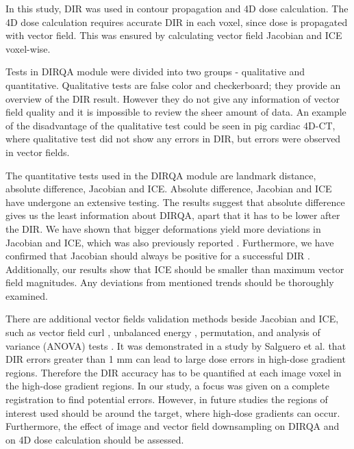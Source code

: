 \documentclass[type=dr, dr=rernat, accentcolor=tud7b,colorbacktitle, bigchapter, openright, twoside, 12pt ]{tudthesis}
\begin{document}
In this study, DIR was used in contour propagation and 4D dose calculation. The 4D dose calculation requires 
accurate DIR in each voxel, since dose is propagated with vector field. This was ensured by calculating vector field Jacobian and ICE voxel-wise. 

Tests in DIRQA module were divided into two groups - qualitative and quantitative. Qualitative tests are false color and checkerboard; they provide an overview of the DIR result.
However they do not give any information of vector field quality and it is impossible to review the sheer amount of data. An example of the disadvantage of the qualitative test could be seen in pig cardiac 4D-CT, where qualitative test did not show
any errors in DIR, but errors were observed in vector fields. 

The quantitative tests used in the DIRQA module are landmark distance, absolute difference, Jacobian and ICE. Absolute difference, Jacobian and ICE have undergone an extensive testing. The results suggest
that absolute difference gives us the least information about DIRQA, apart that it has to be lower after the DIR. 
We have shown that bigger deformations yield more deviations in Jacobian and ICE, which was also previously reported \cite{Stanley2013}. 
Furthermore, we have confirmed that Jacobian should always be positive for a successful DIR \cite{Rey2002}. Additionally, our results show that ICE should 
be smaller than maximum vector field magnitudes. Any deviations from mentioned trends should be thoroughly examined.

There are additional vector fields validation methods beside Jacobian and ICE, such as vector field curl \cite{Schreibmann2012}, unbalanced energy \cite{Zhong2007}, 
permutation, and analysis of variance (ANOVA) tests \cite{Klein2009}.
It was demonstrated in a study by Salguero et al. \cite{Salguero2011} that DIR errors greater than 1 mm can lead to large dose errors in high-dose gradient regions. 
Therefore the DIR accuracy has to be quantified at each image voxel in the high-dose 
gradient regions. In our study, a focus was given on a complete registration to find potential errors. However, in future studies the regions of interest used
should be around the target, where high-dose gradients can occur. Furthermore, the effect of image and vector field downsampling on DIRQA and on 4D dose calculation should be assessed.
\end{document}
